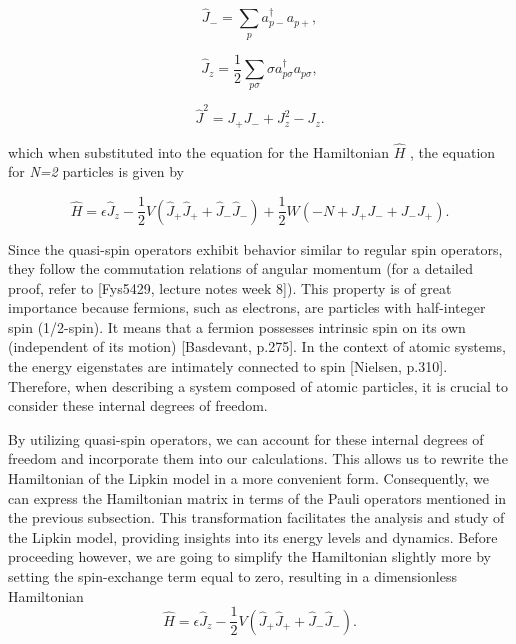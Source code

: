 \documentclass[onecolumn,10pt,cleanfoot]{asme2ej}
\begin{document}
\begin{equation}
\hat{J}_{-} = \sum_{p} a_{p-}^{\dagger}a_{p+},
\end{equation}

\begin{equation}
\hat{J}_{z} = \frac{1}{2}\sum_{p\sigma} \sigma a_{p\sigma}^{\dagger}a_{p\sigma}, 
\end{equation}

\begin{equation}
\hat{J}^{2} = J_{+}J_{-} + J_{z}^{2} - J_{z}.
\end{equation}

which when substituted into the equation for the Hamiltonian $\hat{H}$ , the equation for \textit{N=2} particles is given by

\begin{equation}
\hat{H} = \epsilon\hat{J}_z - \frac{1}{2}V(\hat{J}_+\hat{J}_+ + \hat{J}_-\hat{J}_-) + \frac{1}{2}W\left( -N + J_+ J_- + J_- J_+ \right).
\end{equation}

Since the quasi-spin operators exhibit behavior similar to regular spin operators, they follow the commutation relations of angular momentum (for a detailed proof, refer to [Fys5429, lecture notes week 8]). This property is of great importance because fermions, such as electrons, are particles with half-integer spin (1/2-spin). It means that a fermion possesses intrinsic spin on its own (independent of its motion) [Basdevant, p.275]. In the context of atomic systems, the energy eigenstates are intimately connected to spin [Nielsen, p.310]. Therefore, when describing a system composed of atomic particles, it is crucial to consider these internal degrees of freedom.

By utilizing quasi-spin operators, we can account for these internal degrees of freedom and incorporate them into our calculations. This allows us to rewrite the Hamiltonian of the Lipkin model in a more convenient form. Consequently, we can express the Hamiltonian matrix in terms of the Pauli operators mentioned in the previous subsection. This transformation facilitates the analysis and study of the Lipkin model, providing insights into its energy levels and dynamics. Before proceeding however, we are going to simplify the Hamiltonian slightly more by setting the spin-exchange term equal to zero, resulting in a dimensionless Hamiltonian
\begin{equation}
\hat{H} = \epsilon\hat{J}_z - \frac{1}{2}V(\hat{J}_+\hat{J}_+ + \hat{J}_-\hat{J}_-).
\end{equation}
\end{document}
